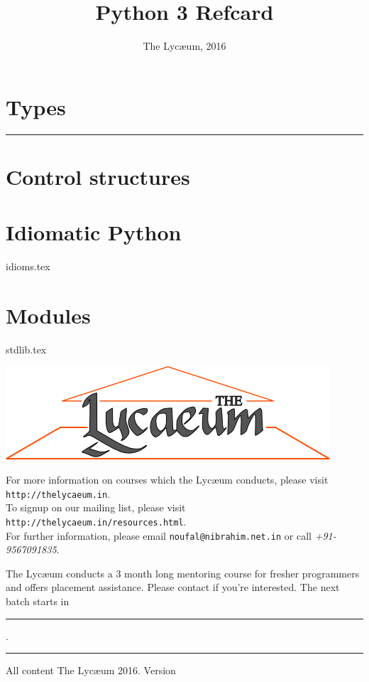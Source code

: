 \documentclass{refsheet}
\title{Python 3 Refcard}
\author{The Lyc\ae{}um, 2016}
\date{}
\begin{document}
\maketitle
\section{Types}







\noindent\rule{\linewidth}{0.05ex}
\section{Control structures}







\section{Idiomatic Python}
 {idioms.tex}

\section{Modules}
 {stdlib.tex}

\begin{center}
\includegraphics[scale=0.4]{images/parthenon-callig.png}
\end{center}
For more information on courses which the Lyc\ae{}um conducts, please
visit \texttt{http://thelycaeum.in}. \\To signup on our mailing list,
please visit \texttt{http://thelycaeum.in/resources.html}. \\For further
information, please email \texttt{noufal@nibrahim.net.in} or call
\textit{+91-9567091835}.
\vspace{0.5cm}

The Lyc\ae{}um conducts a 3 month long mentoring course for fresher
programmers and offers placement assistance. Please contact if you're
interested. The next batch starts in \rule{3cm}{0.1ex}.

\noindent\rule{\linewidth}{0.05ex}
\footnotesize All content \textcopyright The Lyc\ae{}um 2016. Version 
\end{document}
